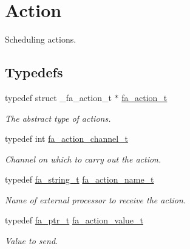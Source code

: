 \hypertarget{group___fa_action}{\section{Action}
\label{group___fa_action}
}


Scheduling actions.  


\subsection*{Typedefs}
\begin{DoxyCompactItemize}
\item 
typedef struct \-\_\-fa\-\_\-action\-\_\-t $\ast$ \hyperlink{group___fa_action_gadb08ae063168671e5fedc6c23f20ae4b}{fa\-\_\-action\-\_\-t}
\begin{DoxyCompactList}\small\item\em The abstract type of actions. \end{DoxyCompactList}\item 
typedef int \hyperlink{group___fa_action_ga042610e7e8a7615937f5eeb3a8d789c5}{fa\-\_\-action\-\_\-channel\-\_\-t}
\begin{DoxyCompactList}\small\item\em Channel on which to carry out the action. \end{DoxyCompactList}\item 
typedef \hyperlink{group___fa_string_gacada63033b77bc6c39fa632ae199349b}{fa\-\_\-string\-\_\-t} \hyperlink{group___fa_action_ga44e517a8d2281a0556ac109c2b639d4b}{fa\-\_\-action\-\_\-name\-\_\-t}
\begin{DoxyCompactList}\small\item\em Name of external processor to receive the action. \end{DoxyCompactList}\item 
typedef \hyperlink{group___fa_ga915ddeae99ad7568b273d2b876425197}{fa\-\_\-ptr\-\_\-t} \hyperlink{group___fa_action_gaac4d474d26b235df5826124cb43464ce}{fa\-\_\-action\-\_\-value\-\_\-t}
\begin{DoxyCompactList}\small\item\em Value to send. \end{DoxyCompactList}\end{DoxyCompactItemize}
